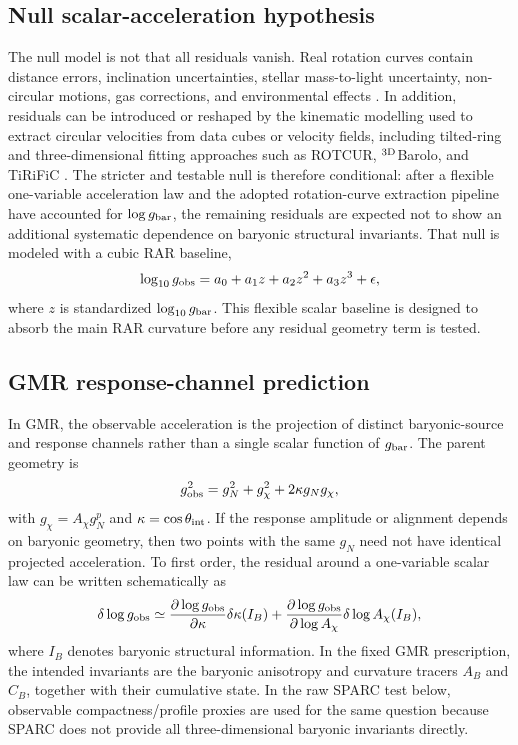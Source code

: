 ﻿\documentclass[twocolumn]{aastex631}
\begin{document}
\subsection{Null scalar-acceleration hypothesis}
The null model is not that all residuals vanish.  Real rotation curves contain distance errors, inclination uncertainties, stellar mass-to-light uncertainty, non-circular motions, gas corrections, and environmental effects \citep{Trachternach2008,BellDeJong2001,Chabrier2003,Meidt2014,Courteau2014}.  In addition, residuals can be introduced or reshaped by the kinematic modelling used to extract circular velocities from data cubes or velocity fields, including tilted-ring and three-dimensional fitting approaches such as ROTCUR, $^{3{\rm D}}$Barolo, and TiRiFiC \citep{Begeman1991,DiTeodoro2015,Jozsa2007,Iorio2017}.  The stricter and testable null is therefore conditional: after a flexible one-variable acceleration law and the adopted rotation-curve extraction pipeline have accounted for $\log g_{\rm bar}$, the remaining residuals are expected not to show an additional systematic dependence on baryonic structural invariants.  That null is modeled with a cubic RAR baseline,
\begin{equation}
\log_{10}g_{\rm obs}=a_0+a_1 z+a_2 z^2+a_3 z^3+\epsilon,
\end{equation}
where $z$ is standardized $\log_{10}g_{\rm bar}$.  This flexible scalar baseline is designed to absorb the main RAR curvature before any residual geometry term is tested.

\subsection{GMR response-channel prediction}
In GMR, the observable acceleration is the projection of distinct baryonic-source and response channels rather than a single scalar function of $g_{\rm bar}$.  The parent geometry is
\begin{equation}
g_{\rm obs}^2=g_N^2+g_\chi^2+2\kappa g_Ng_\chi ,
\end{equation}
with $g_\chi=A_\chi g_N^p$ and $\kappa=\cos\theta_{\rm int}$.  If the response amplitude or alignment depends on baryonic geometry, then two points with the same $g_N$ need not have identical projected acceleration.  To first order, the residual around a one-variable scalar law can be written schematically as
\begin{equation}
\delta\log g_{\rm obs}
\simeq
\frac{\partial\log g_{\rm obs}}{\partial \kappa}\delta\kappa(I_B)
+
\frac{\partial\log g_{\rm obs}}{\partial \log A_\chi}\delta\log A_\chi(I_B),
\end{equation}
where $I_B$ denotes baryonic structural information.  In the fixed GMR prescription, the intended invariants are the baryonic anisotropy and curvature tracers $A_B$ and $C_B$, together with their cumulative state.  In the raw SPARC test below, observable compactness/profile proxies are used for the same question because SPARC does not provide all three-dimensional baryonic invariants directly.
\end{document}
